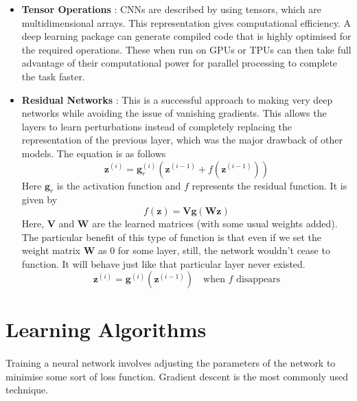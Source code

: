 \documentclass{article}
\begin{document}
\begin{itemize}
    \item \textbf{Tensor Operations} : CNNs are described by using tensors, which are multidimensional arrays. This representation gives computational efficiency. A deep learning package can generate compiled code that is highly optimised for the required operations. These when run on GPUs or TPUs can then take full advantage of their computational power for parallel processing to complete the task faster.
    \item \textbf{Residual Networks} : This is a successful approach to making very deep networks while avoiding the issue of vanishing gradients. This allows the layers to learn perturbations instead of completely replacing the representation of the previous layer, which was the major drawback of other models. The equation is as follows
        \begin{equation*}
          \mathbf{z}^{(i)} = \mathbf{g}^{(i)}_r \left( \mathbf{z}^{(i-1)} + f(\mathbf{z}^{(i-1)}) \right)
        \end{equation*}
        Here $\mathbf{g}_r$ is the activation function and $f$ represents the residual function. It is given by
        \begin{equation*}
          f(\mathbf{z}) = \mathbf{V} \mathbf{g} (\mathbf{W} \mathbf{z})
        \end{equation*}
        Here, $\mathbf{V}$ and $\mathbf{W}$ are the learned matrices (with some usual weights added). The particular benefit of this type of function is that even if we set the weight matrix \textbf{W} as 0 for some layer, still, the network wouldn’t cease to function. It will behave just like that particular layer never existed.
        \begin{equation*}
          \mathbf{z}^{(i)} = \mathbf{g}^{(i)} \left( \mathbf{z}^{(i-1)} \right) \quad \text{when } f \text{ disappears}
        \end{equation*}
  \end{itemize}


\section{Learning Algorithms}
  \paragraph{} Training a neural network involves adjusting the parameters of the network to minimise some sort of loss function. Gradient descent is the most commonly used technique.
\end{document}
